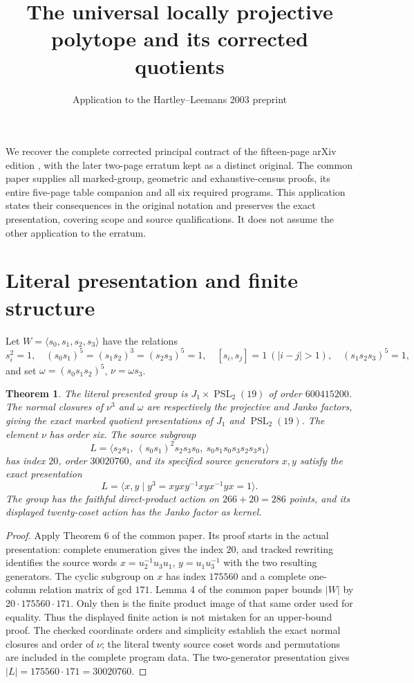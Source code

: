\documentclass[11pt,a4paper]{article}
\title{The universal locally projective polytope and its corrected quotients}
\author{Application to the Hartley--Leemans 2003 preprint}\date{}
\newtheorem{theorem}{Theorem}\newtheorem{lemma}[theorem]{Lemma}
\newcommand{\PSL}{\operatorname{PSL}}\newcommand{\Aut}{\operatorname{Aut}}
\begin{document}
\maketitle
We recover the complete corrected principal contract of the fifteen-page arXiv edition \cite{source}, with the later two-page erratum \cite{erratum} kept as a distinct original. The common paper \cite{common} supplies all marked-group, geometric and exhaustive-census proofs, its entire five-page table companion and all six required programs. This application states their consequences in the original notation and preserves the exact presentation, covering scope and source qualifications. It does not assume the other application to the erratum.

\section{Literal presentation and finite structure}
Let $W=\langle s_0,s_1,s_2,s_3\rangle$ have the relations
\[
 s_i^2=1,\quad(s_0s_1)^5=(s_1s_2)^3=(s_2s_3)^5=1,
 \quad[s_i,s_j]=1\ (|i-j|>1),\quad(s_1s_2s_3)^5=1,
\]
and set $\omega=(s_0s_1s_2)^5$, $\nu=\omega s_3$.
\begin{theorem}\label{group}
The literal presented group is $J_1\times\PSL_2(19)$ of order $600415200$. The normal closures of $\nu^3$ and $\omega$ are respectively the projective and Janko factors, giving the exact marked quotient presentations of $J_1$ and $\PSL_2(19)$. The element $\nu$ has order six. The source subgroup
\[
 L=\langle s_2s_1,\ (s_0s_1)^2s_2s_3s_0,\ s_0s_1s_0s_3s_2s_3s_1\rangle
\]
has index $20$, order $30020760$, and its specified source generators $x,y$ satisfy the exact presentation
\[
 L=\langle x,y\mid y^3=xyxy^{-1}xyx^{-1}yx=1\rangle.
\]
The group has the faithful direct-product action on $266+20=286$ points, and its displayed twenty-coset action has the Janko factor as kernel.
\end{theorem}
\begin{proof}
Apply Theorem 6 of the common paper. Its proof starts in the actual presentation: complete enumeration gives the index $20$, and tracked rewriting identifies the source words $x=u_2^{-1}u_3u_1$, $y=u_1u_3^{-1}$ with the two resulting generators. The cyclic subgroup on $x$ has index $175560$ and a complete one-column relation matrix of gcd $171$. Lemma 4 of the common paper bounds $|W|$ by $20\cdot175560\cdot171$. Only then is the finite product image of that same order used for equality. Thus the displayed finite action is not mistaken for an upper-bound proof. The checked coordinate orders and simplicity establish the exact normal closures and order of $\nu$; the literal twenty source coset words and permutations are included in the complete program data. The two-generator presentation gives $|L|=175560\cdot171=30020760$.
\end{proof}
\end{document}
